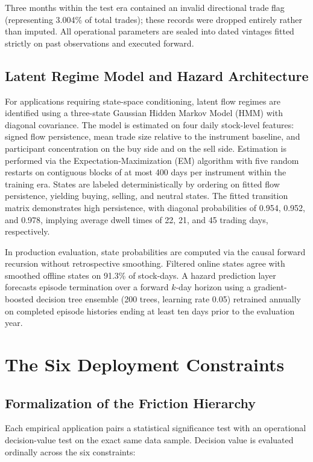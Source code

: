 \documentclass{ieeeaccess}
\begin{document}
Three months within the test era contained an invalid directional trade flag (representing 3.004\% of total trades); these records were dropped entirely rather than imputed. All operational parameters are sealed into dated vintages fitted strictly on past observations and executed forward.

\subsection{Latent Regime Model and Hazard Architecture}
For applications requiring state-space conditioning, latent flow regimes are identified using a three-state Gaussian Hidden Markov Model (HMM) with diagonal covariance. The model is estimated on four daily stock-level features: signed flow persistence, mean trade size relative to the instrument baseline, and participant concentration on the buy side and on the sell side. Estimation is performed via the Expectation-Maximization (EM) algorithm with five random restarts on contiguous blocks of at most 400 days per instrument within the training era. States are labeled deterministically by ordering on fitted flow persistence, yielding buying, selling, and neutral states. The fitted transition matrix demonstrates high persistence, with diagonal probabilities of 0.954, 0.952, and 0.978, implying average dwell times of 22, 21, and 45 trading days, respectively.

In production evaluation, state probabilities are computed via the causal forward recursion without retrospective smoothing. Filtered online states agree with smoothed offline states on 91.3\% of stock-days. A hazard prediction layer forecasts episode termination over a forward $k$-day horizon using a gradient-boosted decision tree ensemble (200 trees, learning rate 0.05) retrained annually on completed episode histories ending at least ten days prior to the evaluation year.

\section{The Six Deployment Constraints}
\label{sec:protocol}

\subsection{Formalization of the Friction Hierarchy}
Each empirical application pairs a statistical significance test with an operational decision-value test on the exact same data sample. Decision value is evaluated ordinally across the six constraints:
\end{document}
